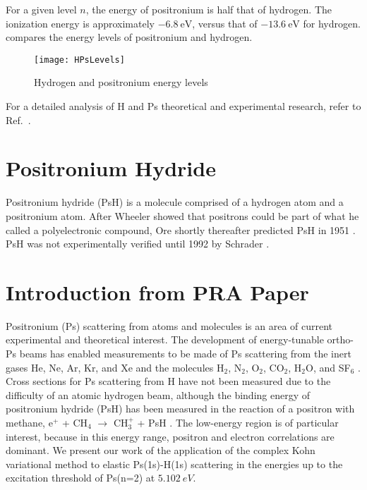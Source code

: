 \documentclass[Dissertation.tex]{subfiles}
\begin{document}
For a given level $n$, the energy of positronium is half that of hydrogen. The
ionization energy is approximately $\SI{-6.8}{\eV}$, versus that of
$\SI{-13.6}{\eV}$ for hydrogen.  compares the energy levels
of positronium and hydrogen.
\begin{figure}[H]
	\centering
	\texttt{[image: HPsLevels]}
	\caption{Hydrogen and positronium energy levels}
	\label{fig:HPsLevels}
\end{figure}

For a detailed analysis of H and Ps theoretical and experimental research,
refer to Ref.~\cite{Karshenboim2005}.

\section{Positronium Hydride}
\label{sec:PsH}
Positronium hydride (PsH) is a molecule  comprised of 
a hydrogen atom and a positronium atom. After Wheeler \cite{Wheeler1946} 
showed that positrons could be part of what he called a polyelectronic 
compound, Ore shortly thereafter predicted PsH in 1951 \cite{Ore1951}. PsH 
was not experimentally verified until 1992 by Schrader \cite{Schrader1992}. 




\section{Introduction from PRA Paper}
Positronium (Ps) scattering from atoms and molecules is an area of current 
experimental and theoretical interest. The development of energy-tunable
ortho-Ps beams
\cite{Brown1985,Laricchia1987,Zafar1996,Garner1996,Laricchia2008} 
has enabled measurements to be made of Ps scattering from the inert gases He,
Ne, Ar, Kr, and Xe
\cite{Garner1996,Garner2000,Armitage2002,Laricchia2004,Armitage2006,Laricchia2008,Engbrecht2008,Brawley2010a}
and the molecules H$_2$, N$_2$, O$_2$, CO$_2$, H$_2$O, and SF$_6$
\cite{Garner1996,Garner1998,Garner2000,Laricchia2004,Armitage2006,Beale2006,Brawley2010a}.
Cross sections for Ps scattering from H have not been measured due to the
difficulty of an atomic hydrogen beam, although the binding energy of positronium
hydride (PsH) has been measured in the reaction of a positron with methane,
e$^+$ + CH$_4$ $\to$ CH$_3^+$ + PsH \cite{Schrader1992}. The low-energy region
is of particular interest, because in this energy range, positron and electron 
correlations are dominant. We present
\cite{Conferences1,Conferences2,Conferences3,WoodsDiss2015} 
our work of the application of the complex Kohn variational 
method to elastic Ps(1s)-H(1s) scattering in the energies up to the 
excitation threshold of Ps(n=2) at $\SI{5.102}{eV}$.
\end{document}
